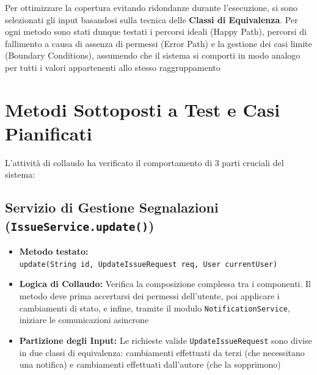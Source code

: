 Per ottimizzare la copertura evitando ridondanze durante l'esecuzione, si sono selezionati gli input basandosi sulla tecnica delle \textbf{Classi di Equivalenza}. Per ogni metodo sono stati dunque testati i percorsi ideali (Happy Path), percorsi di fallimento a causa di assenza di permessi (Error Path) e la gestione dei casi limite (Boundary Conditions), assumendo che il sistema si comporti in modo analogo per tutti i valori appartenenti allo stesso raggruppamento

\section{Metodi Sottoposti a Test e Casi Pianificati}
L'attività di collaudo ha verificato il comportamento di 3 parti cruciali del sistema:

\subsection{Servizio di Gestione Segnalazioni (\texttt{IssueService.update()})}
\begin{itemize}
    \item \textbf{Metodo testato:}\\ \texttt{update(String id, UpdateIssueRequest req, User currentUser)}
    \item \textbf{Logica di Collaudo:} Verifica la composizione complessa tra i componenti. Il metodo deve prima accertarsi dei permessi dell'utente, poi applicare i cambiamenti di stato, e infine, tramite il modulo \texttt{NotificationService}, iniziare le comunicazioni asincrone
    \item \textbf{Partizione degli Input:} Le richieste valide \texttt{UpdateIssueRequest} sono divise in due classi di equivalenza: cambiamenti effettuati da terzi (che necessitano una notifica) e cambiamenti effettuati dall'autore (che la sopprimono)
\end{itemize}

